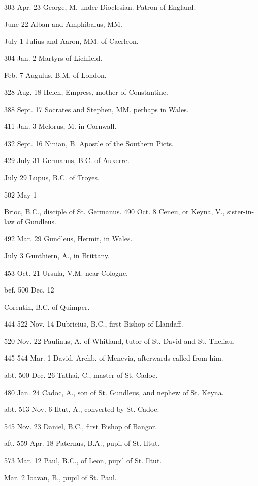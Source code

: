 303 Apr.
23
George, M. under Dioclesian. Patron of England.

June 22
Alban
and Amphibalus, MM.

July 1
Julius and Aaron, MM. of Caerleon.

304 Jan.
2
Martyrs of Lichfield.

Feb. 7
Augulus, B.M. of London.

328 Aug.
18
Helen, Empress, mother of Constantine.

388 Sept.
17
Socrates and Stephen, MM. perhaps in Wales.

411 Jan.
3
Melorus, M. in Cornwall.


432 Sept.
16
Ninian,
B. Apostle of the Southern Picts.

429 July
31
Germanus, B.C. of Auxerre.

July 29
Lupus,
B.C. of Troyes.

502 May
1

Brioc, B.C., disciple of St. Germanus. 490 Oct.
8
Ceneu,
or Keyna, V., sister-in-law of Gundleus.

492 Mar.
29
Gundleus, Hermit, in Wales.

July 3
Gunthiern, A., in Brittany.

453 Oct.
21
Ursula, V.M. near Cologne.

bef. 500 Dec. 12

Corentin, B.C. of Quimper.


444-522 Nov.
14
Dubricius,
B.C., first Bishop of Llandaff.

520 Nov.
22
Paulinus, A. of Whitland, tutor of St. David and St. Theliau.

445-544 Mar.
1
David,
Archb. of Menevia, afterwards called from him.

abt. 500 Dec.
26
Tathai,
C., master of St. Cadoc.

480 Jan.
24
Cadoc, A., son of St. Gundleus, and nephew of St. Keyna.

abt. 513 Nov.
6
Iltut,
A., converted by St. Cadoc.

545 Nov.
23
Daniel, B.C., first Bishop of Bangor.

aft. 559
Apr. 18
Paternus,
B.A., pupil of St. Iltut.

573 Mar.
12
Paul, B.C., of Leon, pupil of St. Iltut.

Mar. 2
Ioavan, B., pupil of St. Paul.

